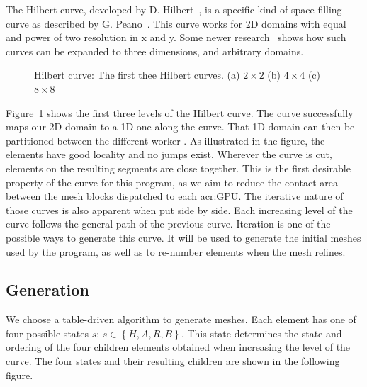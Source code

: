 The Hilbert curve, developed by D. Hilbert~\cite{Hilbert1891}, is a specific kind of space-filling
curve as described by G. Peano~\cite{Peano1890}. This curve works for 2D domains with equal and
power of two resolution in x and y. Some newer research~\cite{Haverkort2011} shows how such curves
can be expanded to three dimensions, and arbitrary domains.

\begin{figure}[H]
	\centering
	\hfill
	\hfill
	\caption{Hilbert curve: The first thee Hilbert curves. (a) \(2\times2\) (b) \(4\times4\) (c) \(8\times8\)}\label{fig:hilbert_curves}
\end{figure}

Figure~\ref{fig:hilbert_curves} shows the first three levels of the Hilbert curve. The curve
successfully maps our 2D domain to a 1D one along the curve. That 1D domain can then be partitioned
between the different worker . As illustrated in the figure, the elements have
good locality and no jumps exist. Wherever the curve is cut, elements on the resulting segments are
close together. This is the first desirable property of the curve for this program, as we aim to
reduce the contact area between the mesh blocks dispatched to each \acrshort{acr:GPU}. The iterative
nature of those curves is also apparent when put side by side. Each increasing level of the curve
follows the general path of the previous curve. Iteration is one of the possible ways to generate
this curve. It will be used to generate the initial meshes used by the program, as well as to
re-number elements when the mesh refines.

\subsection{Generation}\label{subsection:load_balancing:hilbert_curve:generation}

We choose a table-driven algorithm to generate meshes. Each element has one of four possible states
\(s\): \(s \in \left \{H, A, R, B \right \} \). This state determines the state and ordering of the
four children elements obtained when increasing the level of the curve. The four states and their
resulting children are shown in the following figure.

